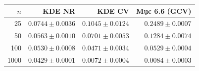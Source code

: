 \begin{center}\small\begin{tabular}{rrrr}\toprule $n$ & KDE NR & KDE CV & Mục 6.6 (GCV)\\\midrule
25 & $0.0744 \pm 0.0036$ & $0.1045 \pm 0.0124$ & $0.2489 \pm 0.0007$\\
50 & $0.0563 \pm 0.0010$ & $0.0701 \pm 0.0053$ & $0.1284 \pm 0.0074$\\
100 & $0.0530 \pm 0.0008$ & $0.0471 \pm 0.0034$ & $0.0529 \pm 0.0004$\\
1000 & $0.0429 \pm 0.0001$ & $0.0072 \pm 0.0004$ & $0.0084 \pm 0.0003$\\
\bottomrule\end{tabular}\end{center}